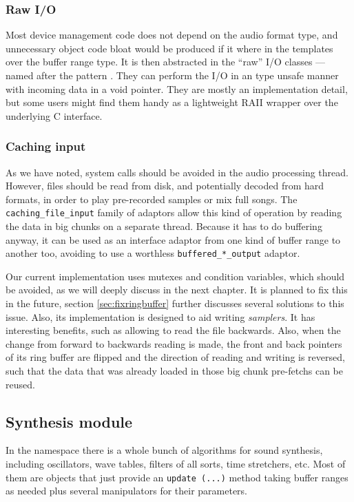 \subsubsection{Raw I/O}

Most device management code does not depend on the audio format type,
and unnecessary object code bloat would be produced if it where in the
templates over the buffer range type. It is then abstracted in the
``raw'' I/O classes --- named after the pattern
. They can perform the I/O in an type
unsafe manner with incoming data in a void pointer. They are mostly an
implementation detail, but some users might find them handy as a
lightweight RAII wrapper over the underlying C interface.

\subsubsection{Caching input}

As we have noted, system calls should be avoided in the audio
processing thread. However, files should be read from disk, and
potentially decoded from hard formats, in order to play pre-recorded
samples or mix full songs. The \texttt{caching\_file\_input} family of
adaptors allow this kind of operation by reading the data in big
chunks on a separate thread. Because it has to do buffering anyway, it
can be used as an interface adaptor from one kind of buffer range to
another too, avoiding to use a worthless \texttt{buffered\_*\_output}
adaptor.

Our current implementation uses mutexes and condition variables, which
should be avoided, as we will deeply discuss in the next chapter. It
is planned to fix this in the future, section \ref{sec:fixringbuffer}
further discusses several solutions to this issue. Also, its
implementation is designed to aid writing \emph{samplers}. It has
interesting benefits, such as allowing to read the file
backwards. Also, when the change from forward to backwards reading is
made, the front and back pointers of its ring buffer are flipped and
the direction of reading and writing is reversed, such that the data
that was already loaded in those big chunk pre-fetchs can be reused.

\subsection{Synthesis module}
\label{sec:ns-synth}

In the  namespace there is a whole bunch of
algorithms for sound synthesis, including oscillators, wave tables,
filters of all sorts, time stretchers, etc. Most of them are objects
that just provide an \texttt{update (...)} method taking buffer ranges
as needed plus several manipulators for their parameters.

